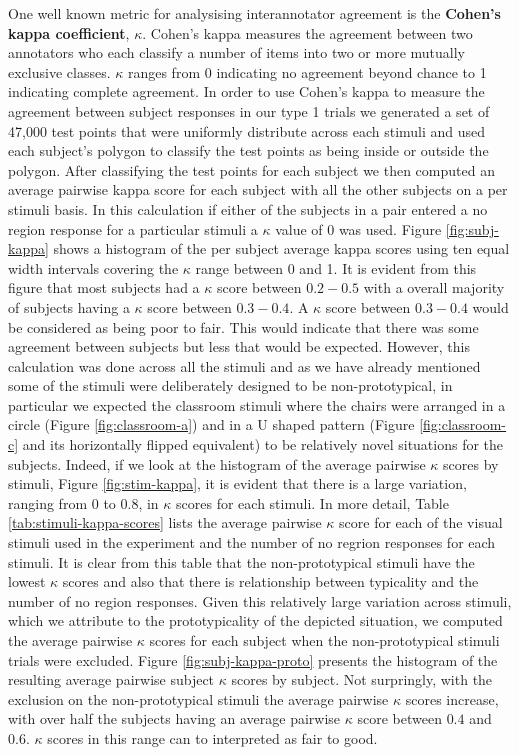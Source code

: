 \documentclass[11pt,letterpaper]{article}
\begin{document}
One well known metric for analysising interannotator agreement is the \textbf{Cohen's kappa coefficient}, $\kappa$. Cohen's kappa measures the agreement between two annotators who each classify a number of items into two or more mutually exclusive classes. $\kappa$ ranges from 0 indicating no agreement beyond chance to 1 indicating complete agreement. In order to use Cohen's kappa to measure the agreement between subject responses in our type 1 trials we generated a set of 47,000 test points that were uniformly distribute across each stimuli and used each subject's polygon to classify the test points as being inside or outside the polygon. After classifying the test points for each subject we then computed an average pairwise kappa score for each subject with all the other subjects on a per stimuli basis. In this calculation if either of the subjects in a pair entered a no region response for a particular stimuli a $\kappa$ value of 0 was used. Figure \ref{fig:subj-kappa} shows a histogram of the per subject average kappa scores using ten equal width intervals covering the $\kappa$ range between 0 and 1.  It is evident from this figure that most subjects had a $\kappa$ score between $0.2-0.5$ with a overall majority of subjects having a $\kappa$ score between $0.3-0.4$. A $\kappa$ score between $0.3-0.4$ would be considered as being poor to fair. This would indicate that there was some agreement between subjects but less that would be expected. However, this calculation was done across all the stimuli and as we have already mentioned some of the stimuli were deliberately designed to be non-prototypical, in particular we expected the classroom stimuli where the chairs were arranged in a circle (Figure \ref{fig:classroom-a}) and in a U shaped pattern (Figure \ref{fig:classroom-c} and its horizontally flipped equivalent) to be relatively novel situations for the subjects. Indeed, if we look at the histogram of the average pairwise $\kappa$ scores by stimuli, Figure \ref{fig:stim-kappa}, it is evident that there is a large variation, ranging from $0$ to $0.8$, in $\kappa$ scores for each stimuli. In more detail, Table \ref{tab:stimuli-kappa-scores} lists the average pairwise $\kappa$ score for each of the visual stimuli used in the experiment and the number of no regrion responses for each stimuli. It is clear from this table that the non-prototypical stimuli have the lowest $\kappa$ scores and also that there is relationship between typicality and the number of no region responses. Given this relatively large variation across stimuli, which we attribute to the prototypicality of the depicted situation, we computed the average pairwise $\kappa$ scores for each subject when the non-prototypical stimuli trials were excluded. Figure \ref{fig:subj-kappa-proto} presents the histogram of the resulting average pairwise subject  $\kappa$ scores by subject. Not surpringly, with the exclusion on the non-prototypical stimuli the average pairwise $\kappa$ scores increase, with over half the subjects having an average pairwise $\kappa$ score between $0.4$ and $0.6$. $\kappa$ scores in this range can to interpreted as fair to good.
\end{document}
